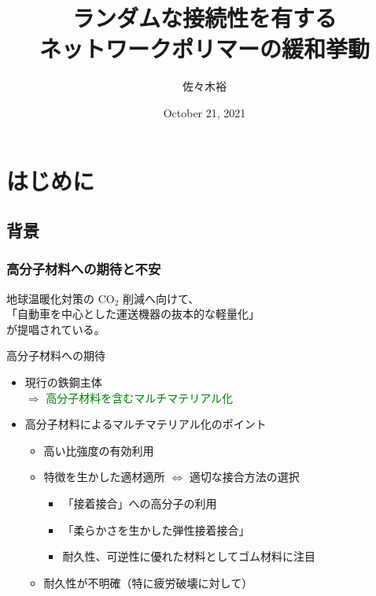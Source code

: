 \documentclass[12pt, dvipdfmx]{beamer}
\title
[ランダムな接続性を有するネットワークポリマーの緩和挙動]
{ランダムな接続性を有する\\ネットワークポリマーの緩和挙動}
\author[東亞合成　佐々木]{佐々木裕}
\institute[東亞合成]{東亞合成}
\date{October 21, 2021}
\begin{document}
\begin{frame}\frametitle{}
	\titlepage
\end{frame}

\section{はじめに}
\subsection{背景}

\begin{frame}
	\frametitle{高分子材料への期待と不安}
	地球温暖化対策の CO$_2$ 削減へ向けて、\\
	{\color{red}「自動車を中心とした運送機器の抜本的な軽量化」}
	\\
	が提唱されている。
	\begin{block}{高分子材料への期待}
		\begin{itemize}
			\item 現行の鉄鋼主体\\$ \Rightarrow$ \textcolor{green}{高分子材料を含むマルチマテリアル化}
			\item 高分子材料によるマルチマテリアル化のポイント
				\begin{itemize}
					\item 高い比強度の有効利用
					\item 特徴を生かした適材適所 $\Leftrightarrow$ 適切な接合方法の選択
						\begin{itemize}
							\item {\color{red} 「接着接合」への高分子の利用}
							\item {\color{red} 「柔らかさを生かした弾性接着接合」}
							\item 耐久性、可逆性に優れた材料として\alert{ゴム材料に注目}
						\end{itemize}
					\item {\color{blue}耐久性が不明確（特に疲労破壊に対して）}
				\end{itemize}
		\end{itemize}
	\end{block}
\end{frame}
\end{document}
